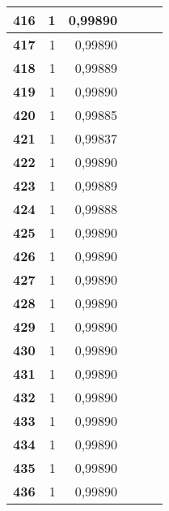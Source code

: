 \begin{longtable}{|r|r|r|l|r|r|}
\textbf{416} & 1 & 0,99890 &  & \multicolumn{1}{l|}{} & \multicolumn{1}{l|}{} \\ \hline
\textbf{417} & 1 & 0,99890 &  & \multicolumn{1}{l|}{} & \multicolumn{1}{l|}{} \\ \hline
\textbf{418} & 1 & 0,99889 &  & \multicolumn{1}{l|}{} & \multicolumn{1}{l|}{} \\ \hline
\textbf{419} & 1 & 0,99890 &  & \multicolumn{1}{l|}{} & \multicolumn{1}{l|}{} \\ \hline
\textbf{420} & 1 & 0,99885 &  & \multicolumn{1}{l|}{} & \multicolumn{1}{l|}{} \\ \hline
\textbf{421} & 1 & 0,99837 &  & \multicolumn{1}{l|}{} & \multicolumn{1}{l|}{} \\ \hline
\textbf{422} & 1 & 0,99890 &  & \multicolumn{1}{l|}{} & \multicolumn{1}{l|}{} \\ \hline
\textbf{423} & 1 & 0,99889 &  & \multicolumn{1}{l|}{} & \multicolumn{1}{l|}{} \\ \hline
\textbf{424} & 1 & 0,99888 &  & \multicolumn{1}{l|}{} & \multicolumn{1}{l|}{} \\ \hline
\textbf{425} & 1 & 0,99890 &  & \multicolumn{1}{l|}{} & \multicolumn{1}{l|}{} \\ \hline
\textbf{426} & 1 & 0,99890 &  & \multicolumn{1}{l|}{} & \multicolumn{1}{l|}{} \\ \hline
\textbf{427} & 1 & 0,99890 &  & \multicolumn{1}{l|}{} & \multicolumn{1}{l|}{} \\ \hline
\textbf{428} & 1 & 0,99890 &  & \multicolumn{1}{l|}{} & \multicolumn{1}{l|}{} \\ \hline
\textbf{429} & 1 & 0,99890 &  & \multicolumn{1}{l|}{} & \multicolumn{1}{l|}{} \\ \hline
\textbf{430} & 1 & 0,99890 &  & \multicolumn{1}{l|}{} & \multicolumn{1}{l|}{} \\ \hline
\textbf{431} & 1 & 0,99890 &  & \multicolumn{1}{l|}{} & \multicolumn{1}{l|}{} \\ \hline
\textbf{432} & 1 & 0,99890 &  & \multicolumn{1}{l|}{} & \multicolumn{1}{l|}{} \\ \hline
\textbf{433} & 1 & 0,99890 &  & \multicolumn{1}{l|}{} & \multicolumn{1}{l|}{} \\ \hline
\textbf{434} & 1 & 0,99890 &  & \multicolumn{1}{l|}{} & \multicolumn{1}{l|}{} \\ \hline
\textbf{435} & 1 & 0,99890 &  & \multicolumn{1}{l|}{} & \multicolumn{1}{l|}{} \\ \hline
\textbf{436} & 1 & 0,99890 &  & \multicolumn{1}{l|}{} & \multicolumn{1}{l|}{} \\ \hline

\end{longtable}
